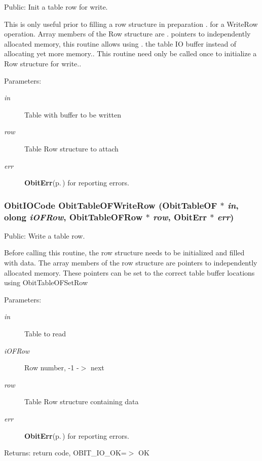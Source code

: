 Public: Init a table row for write. 

This is only useful prior to filling a row structure in preparation . for a Write\-Row operation. Array members of the Row structure are . pointers to independently allocated memory, this routine allows using . the table IO buffer instead of allocating yet more memory.. This routine need only be called once to initialize a Row structure for write.. \begin{Desc}
\item[Parameters:]
\begin{description}
\item[{\em in}]Table with buffer to be written \item[{\em row}]Table Row structure to attach \item[{\em err}]{\bf Obit\-Err}{\rm (p.\,\pageref{structObitErr})} for reporting errors. \end{description}
\end{Desc}
\subsubsection{\setlength{\rightskip}{0pt plus 5cm}Obit\-IOCode Obit\-Table\-OFWrite\-Row ({\bf Obit\-Table\-OF} $\ast$ {\em in}, {\bf olong} {\em i\-OFRow}, {\bf Obit\-Table\-OFRow} $\ast$ {\em row}, {\bf Obit\-Err} $\ast$ {\em err})}\label{ObitTableOF_8h_a20}


Public: Write a table row. 

Before calling this routine, the row structure needs to be initialized and filled with data. The array members of the row structure are pointers to independently allocated memory. These pointers can be set to the correct table buffer locations using Obit\-Table\-OFSet\-Row \begin{Desc}
\item[Parameters:]
\begin{description}
\item[{\em in}]Table to read \item[{\em i\-OFRow}]Row number, -1 -$>$ next \item[{\em row}]Table Row structure containing data \item[{\em err}]{\bf Obit\-Err}{\rm (p.\,\pageref{structObitErr})} for reporting errors. \end{description}
\end{Desc}
\begin{Desc}
\item[Returns:]return code, OBIT\_\-IO\_\-OK=$>$ OK \end{Desc}
